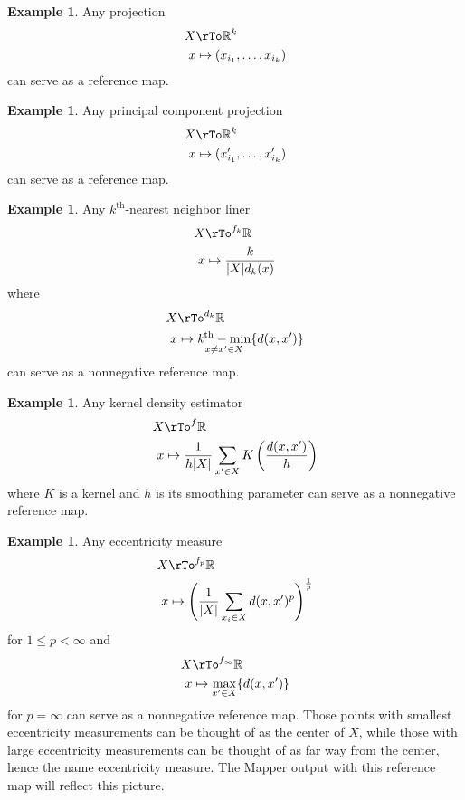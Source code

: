 \documentclass[12pt]{amsart}
\theoremstyle{definition}
\newtheorem{example}[theorem]{Example}
\DeclareMathOperator*{\kmin}{{\it k}^{\text{th}}-min}
\begin{document}
\begin{example}\label{projection} Any projection
\begin{align*}
X & \rTo \mathbb{R}^k \\
x & \mapsto (x_{i_1}, \dots , x_{i_k})
\end{align*}
can serve as a reference map.
\end{example}

\begin{example}\label{principalcomponentprojection} Any principal component projection
\begin{align*}
X & \rTo \mathbb{R}^k \\
x & \mapsto (x_{i_1}', \dots , x_{i_k}')
\end{align*}
can serve as a reference map.
\end{example}

\begin{example}\label{kthnearestneighbordistance} Any $k^{\text{th}}$-nearest neighbor liner
\begin{align*}
X & \rTo^{f_k} \mathbb{R} \\
x & \mapsto \frac{k}{|X| d_k(x)}
\end{align*}
where
\begin{align*}
X & \rTo^{d_k} \mathbb{R} \\
x & \mapsto \kmin\limits_{x \neq x' \in X} \{d(x, x')\}
\end{align*}
can serve as a nonnegative reference map.
\end{example}

\begin{example}\label{kerneldensityestimator} Any kernel density estimator
\begin{align*}
X & \rTo^{f} \mathbb{R} \\
x & \mapsto \frac{1}{h |X|} \sum\limits_{x' \in X} K \left( \frac{d(x, x')}{h} \right)
\end{align*}
where $K$ is a kernel and $h$ is its smoothing parameter can serve as a nonnegative reference map.
\end{example}

\begin{example}\label{eccentricitymeasure} Any eccentricity measure
\begin{align*}
X & \rTo^{f_p} \mathbb{R} \\
x & \mapsto \left( \frac{1}{|X|} \sum\limits_{x_i \in X} d(x, x')^p \right)^{\frac{1}{p}}
\end{align*}
for $1 \leq p < \infty$ and
\begin{align*}
X & \rTo^{f_{\infty}} \mathbb{R} \\
x & \mapsto \max\limits_{x' \in X} \{d(x, x')\}
\end{align*}
for $p = \infty$ can serve as a nonnegative reference map. Those points with smallest eccentricity measurements can be thought of as the center of $X$, while those with large eccentricity measurements can be thought of as far way from the center, hence the name eccentricity measure. The Mapper output with this reference map will reflect this picture.
\end{example}
\end{document}
